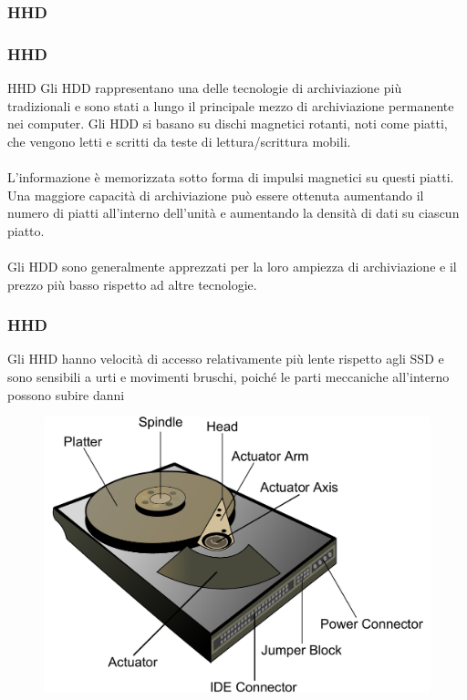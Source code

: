 \subsubsection[HHD]{HHD}
\begin{frame}
	\frametitle{HHD}
	  
	\begin{block}{HHD}
		Gli HDD rappresentano una delle tecnologie di archiviazione più tradizionali e sono stati a lungo il principale mezzo di archiviazione permanente nei computer. Gli HDD si basano su dischi magnetici rotanti, noti come piatti, che vengono letti e scritti da teste di lettura/scrittura mobili.\\~\\ L'informazione è memorizzata sotto forma di impulsi magnetici su questi piatti. Una maggiore capacità di archiviazione può essere ottenuta aumentando il numero di piatti all'interno dell'unità e aumentando la densità di dati su ciascun piatto.\\~\\
		Gli HDD sono generalmente apprezzati per la loro ampiezza di archiviazione e il prezzo più basso rispetto ad altre tecnologie.
	\end{block}
\end{frame}


\begin{frame}
	\frametitle{HHD}
	  
	\begin{block}{}
		 Gli HHD hanno velocità di accesso relativamente più lente rispetto agli SSD e sono sensibili a urti e movimenti bruschi, poiché le parti meccaniche all'interno possono subire danni	 
	\end{block}
	\begin{figure}[!htbp]
		\centering 
		\includegraphics[width=0.65\linewidth]{images/5_memory/hdd_info_0.pdf}
		\label{fig:memory_hdd_info_0}
	\end{figure}
\end{frame}


